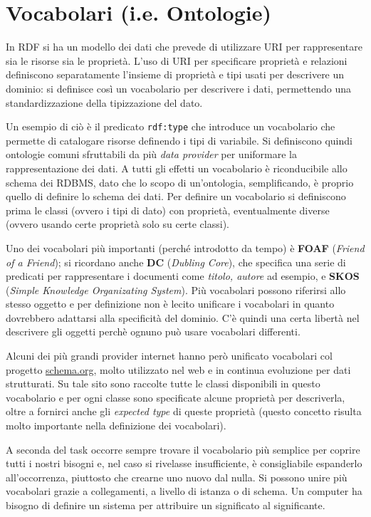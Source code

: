 \documentclass[11pt]{article}
\begin{document}
\section{Vocabolari (i.e. Ontologie)}
In RDF si ha un modello dei dati che prevede di utilizzare URI per rappresentare sia le risorse sia le proprietà.
L'uso di URI per specificare proprietà e relazioni definiscono separatamente l'insieme di proprietà e tipi usati per descrivere un dominio: si definisce così un vocabolario per descrivere i dati, permettendo una standardizzazione della tipizzazione del dato.

Un esempio di ciò è il predicato \verb|rdf:type| che introduce un vocabolario che permette di catalogare risorse definendo i tipi di variabile.
Si definiscono quindi ontologie comuni sfruttabili da più \textit{data provider} per uniformare la rappresentazione dei dati. A tutti gli effetti un vocabolario è riconducibile allo schema dei RDBMS, dato che lo scopo di un'ontologia, semplificando, è proprio quello di definire lo schema dei dati.
Per definire un vocabolario si definiscono prima le classi (ovvero i tipi di dato) con proprietà, eventualmente diverse (ovvero usando certe proprietà solo su certe classi).

Uno dei vocabolari più importanti (perché introdotto da tempo) è \textbf{FOAF} (\textit{Friend of a Friend}); si ricordano anche \textbf{DC} (\textit{Dubling Core}), che specifica una serie di predicati per rappresentare i documenti come \textit{titolo, autore} ad esempio, e \textbf{SKOS} (\textit{Simple Knowledge Organizating System}).
Più vocabolari possono riferirsi allo stesso oggetto e per definizione non è lecito unificare i vocabolari in quanto dovrebbero adattarsi alla specificità del dominio. 
C'è quindi una certa libertà nel descrivere gli oggetti perchè ognuno può usare vocabolari differenti. %

Alcuni dei più grandi provider internet hanno però unificato vocabolari col progetto \url{schema.org}, molto utilizzato nel web e in continua evoluzione per dati strutturati. Su tale sito sono raccolte tutte le classi disponibili in questo vocabolario e per ogni classe sono specificate alcune proprietà per descriverla, oltre a fornirci anche gli \textit{expected type} di queste proprietà (questo concetto risulta molto importante nella definizione dei vocabolari). 

A seconda del task occorre sempre trovare il vocabolario più semplice per coprire tutti i nostri bisogni e, nel caso si rivelasse insufficiente, è consigliabile espanderlo all'occorrenza, piuttosto che crearne uno nuovo dal nulla.
Si possono unire più vocabolari grazie a collegamenti, a livello di istanza o di schema.
Un computer ha bisogno di definire un sistema per attribuire un significato al significante.
\end{document}
